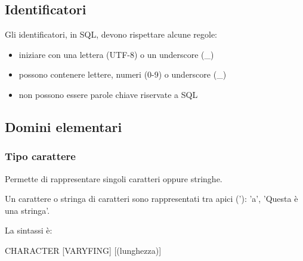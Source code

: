   \subsection{Identificatori}

  Gli identificatori, in SQL, devono rispettare alcune regole:
  \begin{itemize}[label=$\diamond$, itemsep=\smallskipamount]
    \item iniziare con una lettera (UTF-8) o un underscore (\_)
    \item possono contenere lettere, numeri (0-9) o underscore (\_)
    \item non possono essere parole chiave riservate a SQL
  \end{itemize}


  \subsection{Domini elementari}

  \subsubsection{Tipo carattere}
  Permette di rappresentare singoli caratteri oppure stringhe.

  Un carattere o stringa di caratteri sono rappresentati tra apici ('):
  'a', 'Questa è una stringa'.

  La sintassi è:
  \begin{sqlcode}
    CHARACTER [VARYFING] [(lunghezza)]
  \end{sqlcode}

